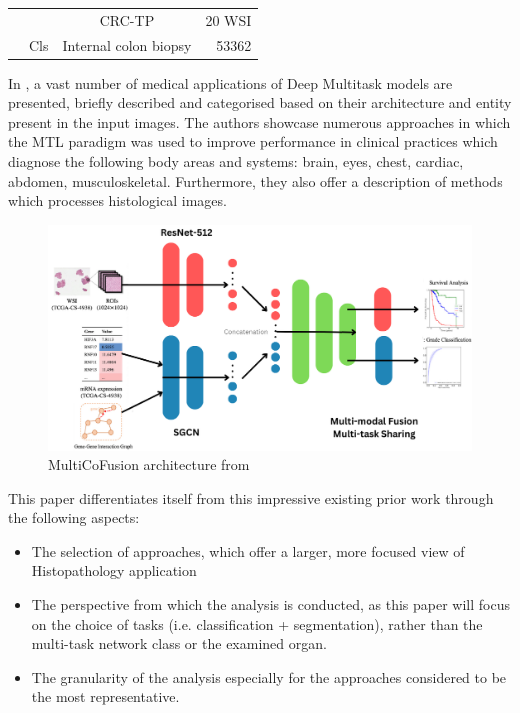 \documentclass[conference]{IEEEtran}
\begin{document}
\begin{table}[]
{\begin{tabular}{|c|c|cr|}
                                                                  &                                  & CRC-TP \cite{javed2020cellular}                                                                                                                                & 20 WSI                                                  \\
    \multirow{-6}{*}{\cite{graham2023one}}       & \multirow{-3}{*}{Cls}            & Internal colon biopsy \cite{wahab2022semantic}                                                                                                                  & 53362 \\ \hline
    \end{tabular}
    }
    \end{table}
    

In \cite{zhao2023multi}, a vast number of medical applications of Deep Multitask models are presented, briefly described and categorised based on their architecture and entity present in the input images. The authors showcase numerous approaches in which the MTL paradigm was used to improve performance in clinical practices which diagnose the following body areas and systems: brain, eyes, chest, cardiac, abdomen, musculoskeletal. Furthermore, they also offer a description of methods which processes histological images. 

\begin{figure}[htb]
    \centering
	\centerline{\includegraphics[scale=0.5]{figures/multimodal_multitask2_V2.png}}
	\caption{MultiCoFusion architecture from \cite{tan2022multi}}
	\label{multimodal_multitask2}
\end{figure}

This paper differentiates itself from this impressive existing prior work through the following aspects:
\begin{itemize}
  \item The selection of approaches, which offer a larger, more focused view of Histopathology application 
  \item The perspective from which the analysis is conducted, as this paper will focus on the choice of tasks (i.e. classification +  segmentation), rather than the multi-task network class or the examined organ.
  \item The granularity of the analysis especially for the approaches considered to be the most representative.
\end{itemize}
\end{document}
